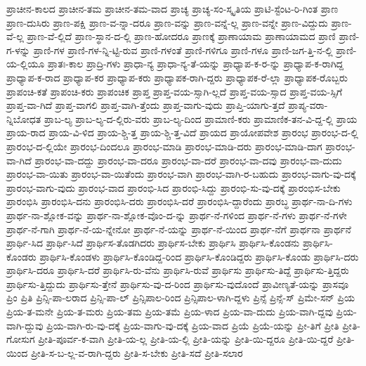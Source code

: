 {ಪ್ರಾಚೀನ-ಕಾಲದ
ಪ್ರಾಚೀನ-ತಮ
ಪ್ರಾಚೀನ-ತಮ-ವಾದ
ಪ್ರಾಚ್ಯ
ಪ್ರಾಚ್ಯ-ಸಂ-ಸ್ಕೃತಿಯ
ಪ್ರಾಟಿ-ಸ್ಟೆಂಟ-ರಿ-ಗಿಂತ
ಪ್ರಾಣ
ಪ್ರಾಣ-ದುಸಿರು
ಪ್ರಾಣ-ಪಕ್ಷಿ
ಪ್ರಾಣ-ವ-ನ್ನಾ-ದರೂ
ಪ್ರಾಣ-ವನ್ನು
ಪ್ರಾಣ-ವನ್ನೆ-ಲ್ಲ
ಪ್ರಾಣ-ವನ್ನೇ
ಪ್ರಾಣ-ವಿದ್ದುದು
ಪ್ರಾಣ-ವೆ-ಲ್ಲ
ಪ್ರಾಣ-ವೆ-ಲ್ಲಿದೆ
ಪ್ರಾಣ-ಸ್ಥಾನ-ದ-ಲ್ಲಿ
ಪ್ರಾಣ-ಹೋದರೂ
ಪ್ರಾಣಕ್ಕೆ
ಪ್ರಾಣಾಯಾಮ
ಪ್ರಾಣಾಯಾಮದ
ಪ್ರಾಣಿ
ಪ್ರಾಣಿ-ಗ-ಳನ್ನು
ಪ್ರಾಣಿ-ಗಳ
ಪ್ರಾಣಿ-ಗಳ-ನ್ನಿ-ಟ್ಟಿ-ರುವ
ಪ್ರಾಣಿ-ಗಳಂತೆ
ಪ್ರಾಣಿ-ಗಳಿಗೂ
ಪ್ರಾಣಿ-ಗಳೂ
ಪ್ರಾಣಿ-ಜಗ-ತ್ತಿ-ನ-ಲ್ಲಿ
ಪ್ರಾಣಿ-ಯ-ಲ್ಲಿಯೂ
ಪ್ರಾತಃ-ಕಾಲ
ಪ್ರಾದ್ರಿ-ಗಳು
ಪ್ರಾಧಾ-ನ್ಯ
ಪ್ರಾಧಾ-ನ್ಯ-ತೆ-ಯನ್ನು
ಪ್ರಾಧ್ಯಾಪ-ಕ-ರ-ನ್ನು
ಪ್ರಾಧ್ಯಾಪ-ಕ-ರಾಗಿದ್ದ
ಪ್ರಾಧ್ಯಾಪ-ಕ-ರಾದ
ಪ್ರಾಧ್ಯಾಪ-ಕರ
ಪ್ರಾಧ್ಯಾಪ-ಕರು
ಪ್ರಾಧ್ಯಾಪಕ-ರಾಗಿ-ದ್ದರು
ಪ್ರಾಧ್ಯಾಪಕ-ರೆ-ಲ್ಲಾ
ಪ್ರಾಧ್ಯಾಪಕ-ರೊಬ್ಬರು
ಪ್ರಾಪಂಚಿ-ಕತೆ
ಪ್ರಾಪಂಚಿ-ಕರು
ಪ್ರಾಪಂಚಿಕ
ಪ್ರಾಪ್ತ
ಪ್ರಾಪ್ತ-ವಯ-ಸ್ಸಾಗಿ-ಲ್ಲದೆ
ಪ್ರಾಪ್ತ-ವಯ-ಸ್ಸಾದ
ಪ್ರಾಪ್ತ-ವಯ-ಸ್ಸಿಗೆ
ಪ್ರಾಪ್ತ-ವಾ-ಗಿದೆ
ಪ್ರಾಪ್ತ-ವಾಗಲಿ
ಪ್ರಾಪ್ತ-ವಾಗಿ-ತ್ತೆಂದು
ಪ್ರಾಪ್ತ-ವಾಗು-ವುದು
ಪ್ರಾಪ್ತಿ-ಯಾಗು-ತ್ತದೆ
ಪ್ರಾಪ್ಯ-ವರಾ-ನ್ನಿಬೋಧತ
ಪ್ರಾಬ-ಲ್ಯ
ಪ್ರಾಬ-ಲ್ಯ-ದ-ಲ್ಲಿರು-ವರು
ಪ್ರಾಬ-ಲ್ಯ-ದಿಂದ
ಪ್ರಾಮಾಣಿ-ಕರು
ಪ್ರಾಮಾಣಿಕ-ತನ-ವಿ-ದ್ದ-ಲ್ಲಿ
ಪ್ರಾಯ
ಪ್ರಾಯ-ರಾದ
ಪ್ರಾಯ-ವಿ-ಳಿದ
ಪ್ರಾಯ-ಶ್ಚಿ-ತ್ತ
ಪ್ರಾಯ-ಶ್ಚಿ-ತ್ತ-ವಿದೆ
ಪ್ರಾಯದ
ಪ್ರಾಯೋಪವೇಶ
ಪ್ರಾರಂಭ
ಪ್ರಾರಂಭ-ದ-ಲ್ಲಿ
ಪ್ರಾರಂಭ-ದ-ಲ್ಲಿಯೇ
ಪ್ರಾರಂಭ-ದಿಂದಲೂ
ಪ್ರಾರಂಭ-ಮಾಡಿ
ಪ್ರಾರಂಭ-ಮಾಡಿ-ದರು
ಪ್ರಾರಂಭ-ಮಾಡಿ-ದಾಗ
ಪ್ರಾರಂಭ-ವಾ-ಗಿದೆ
ಪ್ರಾರಂಭ-ವಾ-ದದ್ದು
ಪ್ರಾರಂಭ-ವಾ-ದರೂ
ಪ್ರಾರಂಭ-ವಾ-ದರೆ
ಪ್ರಾರಂಭ-ವಾ-ದವು
ಪ್ರಾರಂಭ-ವಾ-ದುದು
ಪ್ರಾರಂಭ-ವಾ-ಯಿತು
ಪ್ರಾರಂಭ-ವಾ-ಯಿತೆಂದು
ಪ್ರಾರಂಭ-ವಾಗಿ
ಪ್ರಾರಂಭ-ವಾಗಿ-ರ-ಬಹುದು
ಪ್ರಾರಂಭ-ವಾಗು-ವು-ದಕ್ಕೆ
ಪ್ರಾರಂಭ-ವಾಗು-ವುದು
ಪ್ರಾರಂಭ-ವಾದ
ಪ್ರಾರಂಭಿ-ಸಿದ
ಪ್ರಾರಂಭಿ-ಸಿದ್ದು
ಪ್ರಾರಂಭಿ-ಸು-ವು-ದಕ್ಕೆ
ಪ್ರಾರಂಭಿಸ-ಬೇಕು
ಪ್ರಾರಂಭಿಸಿ
ಪ್ರಾರಂಭಿಸಿ-ದನು
ಪ್ರಾರಂಭಿಸಿ-ದರು
ಪ್ರಾರಂಭಿಸಿ-ದರೆ
ಪ್ರಾರಂಭಿಸಿ-ದ್ದಾರೆಂದು
ಪ್ರಾರಬ್ಧ
ಪ್ರಾರ್ಥ-ನಾ-ದಿ-ಗಳು
ಪ್ರಾರ್ಥ-ನಾ-ಶ್ಲೋಕ-ವನ್ನು
ಪ್ರಾರ್ಥ-ನಾ-ಶ್ಲೋಕ-ವೊಂ-ದ-ನ್ನು
ಪ್ರಾರ್ಥ-ನೆ-ಗಳಿಂದ
ಪ್ರಾರ್ಥ-ನೆ-ಗಳು
ಪ್ರಾರ್ಥ-ನೆ-ಗಳೇ
ಪ್ರಾರ್ಥ-ನೆ-ಗಾಗಿ
ಪ್ರಾರ್ಥ-ನೆ-ಯ-ನ್ನೇನೋ
ಪ್ರಾರ್ಥ-ನೆ-ಯನ್ನು
ಪ್ರಾರ್ಥ-ನೆ-ಯಿಂದ
ಪ್ರಾರ್ಥ-ನೆಗೆ
ಪ್ರಾರ್ಥನಾ
ಪ್ರಾರ್ಥನೆ
ಪ್ರಾರ್ಥಿ-ಸಿದ
ಪ್ರಾರ್ಥಿ-ಸಿದೆ
ಪ್ರಾರ್ಥಿಸ-ತೊಡಗಿದರು
ಪ್ರಾರ್ಥಿಸ-ಬೇಕು
ಪ್ರಾರ್ಥಿಸಿ
ಪ್ರಾರ್ಥಿಸಿ-ಕೊಂಡನು
ಪ್ರಾರ್ಥಿಸಿ-ಕೊಂಡರು
ಪ್ರಾರ್ಥಿಸಿ-ಕೊಂಡಳು
ಪ್ರಾರ್ಥಿಸಿ-ಕೊಂಡಿದ್ದ-ರಿಂದ
ಪ್ರಾರ್ಥಿಸಿ-ಕೊಂಡಿದ್ದರು
ಪ್ರಾರ್ಥಿಸಿ-ಕೊಂಡು
ಪ್ರಾರ್ಥಿಸಿ-ದರು
ಪ್ರಾರ್ಥಿಸಿ-ದರೂ
ಪ್ರಾರ್ಥಿಸಿ-ದರೆ
ಪ್ರಾರ್ಥಿಸಿ-ರು-ವೆನು
ಪ್ರಾರ್ಥಿಸಿ-ರುವೆ
ಪ್ರಾರ್ಥಿಸು
ಪ್ರಾರ್ಥಿಸು-ತಿದ್ದೆ
ಪ್ರಾರ್ಥಿಸು-ತ್ತಿದ್ದರು
ಪ್ರಾರ್ಥಿಸು-ತ್ತಿದ್ದುದು
ಪ್ರಾರ್ಥಿಸು-ತ್ತೇನೆ
ಪ್ರಾರ್ಥಿಸು-ವು-ದ-ರಿಂದ
ಪ್ರಾರ್ಥಿಸು-ವುದೊಂದೆ
ಪ್ರಾವೀಣ್ಯತೆ-ಯನ್ನು
ಪ್ರಾಸವೂ
ಪ್ರಿಂ
ಪ್ರಿತಿ
ಪ್ರಿನ್ಸಿ-ಪಾ-ಲರಾದ
ಪ್ರಿನ್ಸಿ-ಪಾ-ಲ್
ಪ್ರಿನ್ಸಿಪಾಲ-ರಿಂದ
ಪ್ರಿನ್ಸಿಪಾಲ-ಳಾಗಿ-ದ್ದಳು
ಪ್ರಿನ್ಸೆ
ಪ್ರಿನ್ಸೆ-ಸ್
ಪ್ರಿಮೇ-ಸನ್
ಪ್ರಿಯ
ಪ್ರಿಯ-ತ-ಮನೇ
ಪ್ರಿಯ-ತ-ಮರು
ಪ್ರಿಯ-ತಮ
ಪ್ರಿಯ-ತಮೆ
ಪ್ರಿಯ-ಳಾದ
ಪ್ರಿಯ-ವಾ-ದುದು
ಪ್ರಿಯ-ವಾಗಿ-ದ್ದವು
ಪ್ರಿಯ-ವಾಗಿ-ದ್ದುವು
ಪ್ರಿಯ-ವಾಗಿ-ರು-ವು-ದಕ್ಕೆ
ಪ್ರಿಯ-ವಾಗು-ವು-ದಕ್ಕೆ
ಪ್ರಿಯ-ವಾದ
ಪ್ರಿಯೆ
ಪ್ರಿಯೆ-ಯನ್ನು
ಪ್ರೀ-ತಿಗೆ
ಪ್ರೀತಿ
ಪ್ರೀತಿ-ಗೋಸುಗ
ಪ್ರೀತಿ-ಪೂರ್ವ-ಕ-ವಾಗಿ
ಪ್ರೀತಿ-ಯ-ಲ್ಲ
ಪ್ರೀತಿ-ಯ-ಲ್ಲಿ
ಪ್ರೀತಿ-ಯನ್ನು
ಪ್ರೀತಿ-ಯಿ-ದ್ದರೂ
ಪ್ರೀತಿ-ಯಿ-ದ್ದರೆ
ಪ್ರೀತಿ-ಯಿಂದ
ಪ್ರೀತಿ-ಸ-ಬ-ಲ್ಲ-ವ-ರಾಗಿ-ದ್ದರು
ಪ್ರೀತಿ-ಸ-ಬೇಕು
ಪ್ರೀತಿ-ಸದೆ
ಪ್ರೀತಿ-ಸಲಾರ
}
